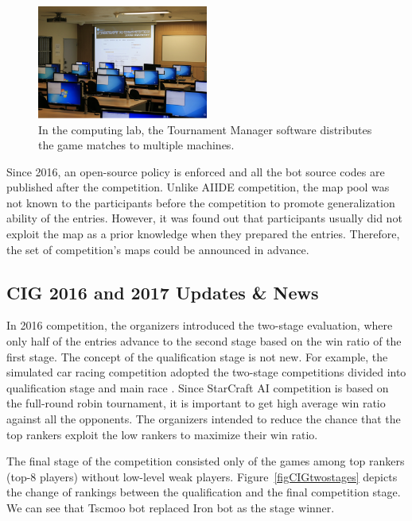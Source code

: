 \begin{figure}[t]
  \centering
  \includegraphics[width=0.5\textwidth]{fig/cig-starcraft-runs.png}
  \caption{In the computing lab, the Tournament Manager software distributes the game matches to multiple machines.}
  \label{figCIGruns}
\end{figure}

Since 2016, an open-source policy is enforced and all the bot source codes are published after the competition. Unlike AIIDE competition, the map pool was not known to the participants before the competition to promote generalization ability of the entries. However, it was found out that participants usually did not exploit the map as a prior knowledge when they prepared the entries. Therefore, the set of competition's maps could be announced in advance. 

\subsection{CIG 2016 and 2017 Updates \& News}\label{subsecCIGnews}

In 2016 competition, the organizers introduced the two-stage evaluation, where only half of the entries advance to the second stage based on the win ratio of the first stage. The concept of the qualification stage is not new. For example, the simulated car racing competition adopted the two-stage competitions divided into qualification stage and main race \cite{loiacono20102009}. Since StarCraft AI competition is based on the full-round robin tournament, it is important to get high average win ratio against all the opponents. The organizers intended to reduce the chance that the top rankers exploit the low rankers to maximize their win ratio. 

The final stage of the competition consisted only of the games among top rankers (top-8 players) without low-level weak players. Figure~\ref{figCIGtwostages} depicts the change of rankings between the qualification and the final competition stage. We can see that Tscmoo bot replaced Iron bot as the stage winner. 


